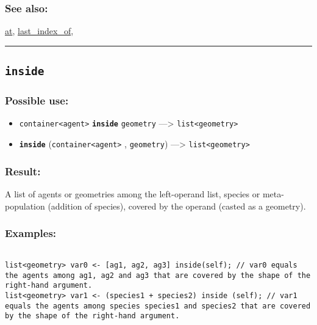 \documentclass[]{book}
\providecommand{\tightlist}{%
  \setlength{\itemsep}{0pt}\setlength{\parskip}{0pt}}
\theoremstyle{definition}
\theoremstyle{definition}
\theoremstyle{definition}
\theoremstyle{remark}
\begin{document}
\subsubsection{See also:}\label{see-also-117}

\href{OperatorsAA\#at}{at},
\href{OperatorsIM\#last_index_of}{last\_index\_of},

\begin{center}\rule{0.5\linewidth}{\linethickness}\end{center}

\subsection{\texorpdfstring{\texttt{inside}}{inside}}\label{inside}

\subsubsection{Possible use:}\label{possible-use-275}

\begin{itemize}
\tightlist
\item
  \texttt{container\textless{}agent\textgreater{}}
  \textbf{\texttt{inside}} \texttt{geometry} ---\textgreater{}
  \texttt{list\textless{}geometry\textgreater{}}
\item
  \textbf{\texttt{inside}}
  (\texttt{container\textless{}agent\textgreater{}} , \texttt{geometry})
  ---\textgreater{} \texttt{list\textless{}geometry\textgreater{}}
\end{itemize}

\subsubsection{Result:}\label{result-265}

A list of agents or geometries among the left-operand list, species or
meta-population (addition of species), covered by the operand (casted as
a geometry).

\subsubsection{Examples:}\label{examples-209}

\begin{verbatim}
 
list<geometry> var0 <- [ag1, ag2, ag3] inside(self); // var0 equals the agents among ag1, ag2 and ag3 that are covered by the shape of the right-hand argument. 
list<geometry> var1 <- (species1 + species2) inside (self); // var1 equals the agents among species species1 and species2 that are covered by the shape of the right-hand argument.
\end{verbatim}
\end{document}
